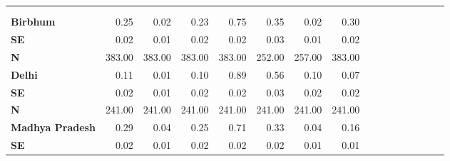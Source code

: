\begin{tabular}{@{\extracolsep{5pt}}lrrrrrrrrrrrrrrr}
\toprule
&  &  &  &  &  &  &  \\
{\bf } &  &  &  &  &  &  &  \\
\hline
{\bf Birbhum} & 0.25\phantom{***} & 0.02\phantom{***} & 0.23\phantom{***} & 0.75\phantom{***} & 0.35\phantom{***} & 0.02\phantom{***} & 0.30\phantom{***} \\
{\bf SE} & 0.02\phantom{***} & 0.01\phantom{***} & 0.02\phantom{***} & 0.02\phantom{***} & 0.03\phantom{***} & 0.01\phantom{***} & 0.02\phantom{***} \\
{\bf N} & 383.00\phantom{***} & 383.00\phantom{***} & 383.00\phantom{***} & 383.00\phantom{***} & 252.00\phantom{***} & 257.00\phantom{***} & 383.00\phantom{***} \\
{\bf Delhi} & 0.11\phantom{***} & 0.01\phantom{***} & 0.10\phantom{***} & 0.89\phantom{***} & 0.56\phantom{***} & 0.10\phantom{***} & 0.07\phantom{***} \\
{\bf SE} & 0.02\phantom{***} & 0.01\phantom{***} & 0.02\phantom{***} & 0.02\phantom{***} & 0.03\phantom{***} & 0.02\phantom{***} & 0.02\phantom{***} \\
{\bf N} & 241.00\phantom{***} & 241.00\phantom{***} & 241.00\phantom{***} & 241.00\phantom{***} & 241.00\phantom{***} & 241.00\phantom{***} & 241.00\phantom{***} \\
{\bf Madhya Pradesh} & 0.29\phantom{***} & 0.04\phantom{***} & 0.25\phantom{***} & 0.71\phantom{***} & 0.33\phantom{***} & 0.04\phantom{***} & 0.16\phantom{***} \\
{\bf SE} & 0.02\phantom{***} & 0.01\phantom{***} & 0.02\phantom{***} & 0.02\phantom{***} & 0.02\phantom{***} & 0.01\phantom{***} & 0.01\phantom{***} \\

\end{tabular}
